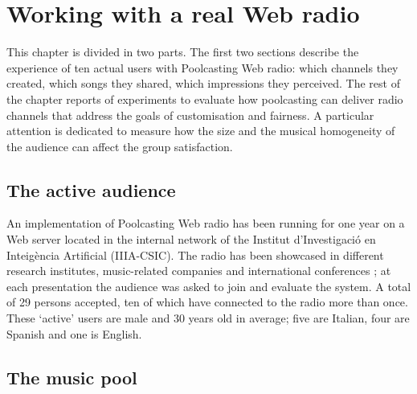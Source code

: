





\section{Working with a real Web radio}

This chapter is divided in two parts.
The first two sections describe the experience of ten actual users with Poolcasting Web radio: which channels they created, which songs they shared, which impressions they perceived.
The rest of the chapter reports of experiments to evaluate how poolcasting can deliver radio channels that address the goals of customisation and fairness.
A particular attention is dedicated to measure how the size and the musical homogeneity of the audience can affect the group satisfaction.

\subsection{The active audience} %
\label{sub:the_audience2}

An implementation of Poolcasting Web radio has been running for one year on a Web server located in the internal network of the Institut d'Investigaci\'{o} en Inte\lgem ig\`{e}ncia Artificial (IIIA-CSIC).
The radio has been showcased in different research institutes, %
music-related companies %
and international conferences \cite{Baccigalupo07c,Baccigalupo07e,Baccigalupo07f};
at each presentation the audience was asked to join and evaluate the system. A total of 29 persons accepted, ten of which have connected to the radio more than once. 
These `active' users are male and 30 years old in average; five are Italian, four are Spanish and one is English.

\subsection{The music pool} %
\label{sub:the_music_pool}

